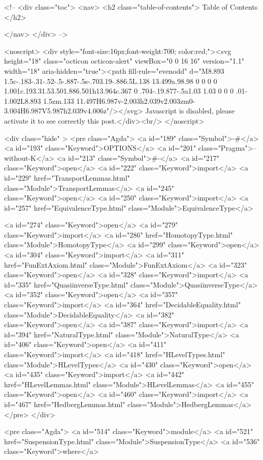   <!-- 
  <div class="toc">
    <nav>
    <h2 class="table-of-contents"> Table of Contents </h2>
      

    </nav>
  </div>
   -->

  <noscript>
  <div style="font-size:16px;font-weight:700; color:red;"><svg height="18" class="octicon octicon-alert" viewBox="0 0 16 16" version="1.1" width="18" aria-hidden="true"><path fill-rule="evenodd" d="M8.893 1.5c-.183-.31-.52-.5-.887-.5s-.703.19-.886.5L.138 13.499a.98.98 0 0 0 0 1.001c.193.31.53.501.886.501h13.964c.367 0 .704-.19.877-.5a1.03 1.03 0 0 0 .01-1.002L8.893 1.5zm.133 11.497H6.987v-2.003h2.039v2.003zm0-3.004H6.987V5.987h2.039v4.006z"/></svg> Javascript is disabled, please activate it to see correctly this post.</div><br/>
  </noscript>

  <div class="hide" >
<pre class="Agda">
<a id="189" class="Symbol">{-#</a> <a id="193" class="Keyword">OPTIONS</a> <a id="201" class="Pragma">--without-K</a> <a id="213" class="Symbol">#-}</a>
<a id="217" class="Keyword">open</a> <a id="222" class="Keyword">import</a> <a id="229" href="TransportLemmas.html" class="Module">TransportLemmas</a>
<a id="245" class="Keyword">open</a> <a id="250" class="Keyword">import</a> <a id="257" href="EquivalenceType.html" class="Module">EquivalenceType</a>

<a id="274" class="Keyword">open</a> <a id="279" class="Keyword">import</a> <a id="286" href="HomotopyType.html" class="Module">HomotopyType</a>
<a id="299" class="Keyword">open</a> <a id="304" class="Keyword">import</a> <a id="311" href="FunExtAxiom.html" class="Module">FunExtAxiom</a>
<a id="323" class="Keyword">open</a> <a id="328" class="Keyword">import</a> <a id="335" href="QuasiinverseType.html" class="Module">QuasiinverseType</a>
<a id="352" class="Keyword">open</a> <a id="357" class="Keyword">import</a> <a id="364" href="DecidableEquality.html" class="Module">DecidableEquality</a>
<a id="382" class="Keyword">open</a> <a id="387" class="Keyword">import</a> <a id="394" href="NaturalType.html" class="Module">NaturalType</a>
<a id="406" class="Keyword">open</a> <a id="411" class="Keyword">import</a> <a id="418" href="HLevelTypes.html" class="Module">HLevelTypes</a>
<a id="430" class="Keyword">open</a> <a id="435" class="Keyword">import</a> <a id="442" href="HLevelLemmas.html" class="Module">HLevelLemmas</a>
<a id="455" class="Keyword">open</a> <a id="460" class="Keyword">import</a> <a id="467" href="HedbergLemmas.html" class="Module">HedbergLemmas</a>
</pre>
</div>


<pre class="Agda">
<a id="514" class="Keyword">module</a> <a id="521" href="SuspensionType.html" class="Module">SuspensionType</a> <a id="536" class="Keyword">where</a>

